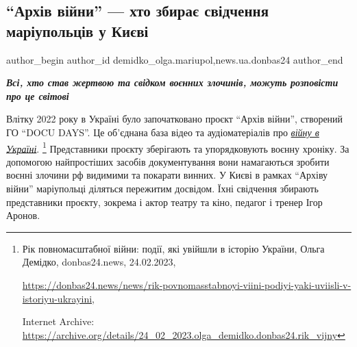  
 
 
 
 
 
\subsection{\enquote{Архів війни} — хто збирає свідчення маріупольців у Києві}
\label{sec:02_03_2023.stz.news.ua.donbas24.1.arhiv_vijny_hto_zbyraje_svidchennja_mrplciv_kyiv}
 
\ifcmt
 author_begin
   author_id demidko_olga.mariupol,news.ua.donbas24
 author_end
\fi

\begin{center}
  \em\bfseries\Large
Всі, хто став жертвою та свідком воєнних злочинів, можуть розповісти про це світові
\end{center}

Влітку 2022 року в Україні було започатковано проєкт \enquote{Архів війни}, створений
ГО \enquote{DOCU DAYS}. Це об'єднана база відео та аудіоматеріалів про \href{https://archive.org/details/24_02_2023.olga_demidko.donbas24.rik_vijny}{\emph{війну в Україні}}.%
\footnote{Рік повномасштабної війни: події, які увійшли в історію України, Ольга Демідко, donbas24.news, 24.02.2023, \par%
\url{https://donbas24.news/news/rik-povnomasstabnoyi-viini-podiyi-yaki-uviisli-v-istoriyu-ukrayini}, \par%
Internet Archive: \url{https://archive.org/details/24_02_2023.olga_demidko.donbas24.rik_vijny}%
} Представники проєкту зберігають та упорядковують воєнну хроніку. За допомогою
найпростіших засобів документування вони намагаються зробити воєнні злочини рф
видимими та покарати винних. У Києві в рамках \enquote{Архіву війни} маріупольці
діляться пережитим досвідом. Їхні свідчення збирають представники проєкту,
зокрема і актор театру та кіно, педагог і тренер Ігор Аронов.

